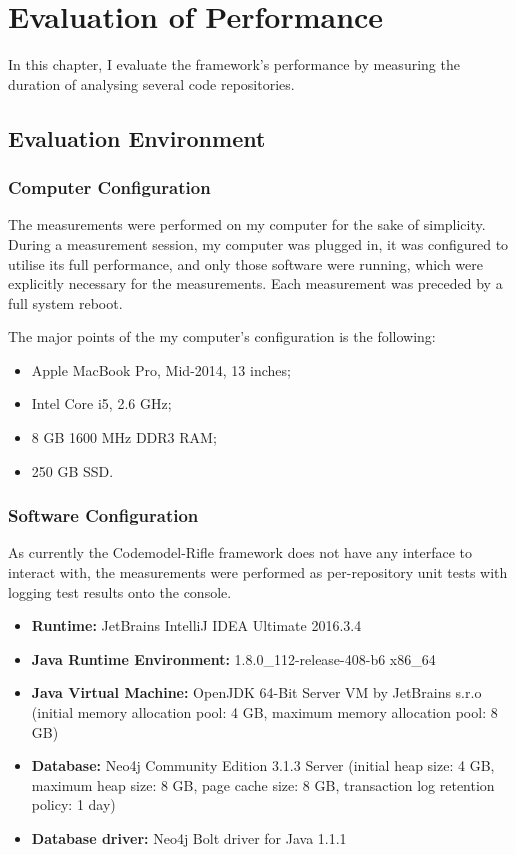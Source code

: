 \chapter{Evaluation of Performance}
\label{chapter:evaluation}

In this chapter, I evaluate the framework's performance by measuring the duration of analysing several code repositories.


\section{Evaluation Environment}

\subsection{Computer Configuration}

The measurements were performed on my computer for the sake of simplicity. During a measurement session, my computer was plugged in, it was configured to utilise its full performance, and only those software were running, which were explicitly necessary for the measurements. Each measurement was preceded by a full system reboot.

The major points of the my computer's configuration is the following:

\begin{itemize}
\item Apple MacBook Pro, Mid-2014, 13 inches;
\item Intel Core i5, 2.6 GHz;
\item 8 GB 1600 MHz DDR3 RAM;
\item 250 GB SSD.
\end{itemize}


\subsection{Software Configuration}

As currently the Codemodel-Rifle framework does not have any interface to interact with, the measurements were performed as per-repository unit tests with logging test results onto the console.

\begin{itemize}
\item \textbf{Runtime:} JetBrains IntelliJ IDEA Ultimate 2016.3.4
\item \textbf{Java Runtime Environment:} 1.8.0\_112-release-408-b6 x86\_64
\item \textbf{Java Virtual Machine:} OpenJDK 64-Bit Server VM by JetBrains s.r.o (initial memory allocation pool: 4 GB, maximum memory allocation pool: 8 GB)
\item \textbf{Database:} Neo4j Community Edition 3.1.3 Server (initial heap size: 4 GB, maximum heap size: 8 GB, page cache size: 8 GB, transaction log retention policy: 1 day)
\item \textbf{Database driver:} Neo4j Bolt driver for Java 1.1.1
\end{itemize}

